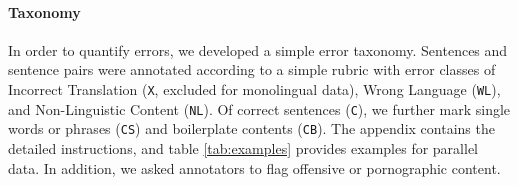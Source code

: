 





\paragraph{Taxonomy}
In order to quantify errors, we developed a simple error taxonomy. Sentences and sentence pairs were annotated according to a simple rubric with error classes of Incorrect Translation (\texttt{X}, excluded for monolingual data), Wrong Language (\texttt{WL}), and Non-Linguistic Content (\texttt{NL}). Of correct sentences (\texttt{C}), we further mark single words or phrases (\texttt{CS}) and boilerplate contents (\texttt{CB}). The appendix contains the detailed instructions, and table \ref{tab:examples} provides examples for parallel data.
In addition, we asked annotators to flag offensive or pornographic content.

